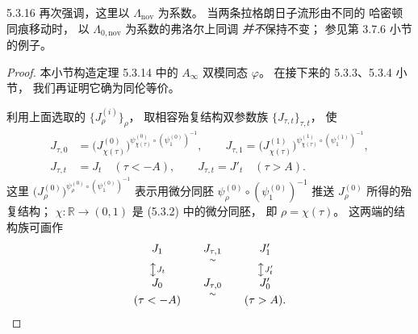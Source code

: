 \begin{remark}{5.3.16}\label{rem:5-3-16}
再次强调，这里以
$\Lambda_{\mathrm{nov}}$ 为系数。
当两条拉格朗日子流形由不同的
哈密顿同痕移动时，
以 $\Lambda_{0,\mathrm{nov}}$
为系数的弗洛尔上同调
\emph{并不}保持不变；
参见第 3.7.6 小节的例子。
\end{remark}

\begin{proof}
本小节构造定理 5.3.14 中的
$A_\infty$ 双模同态 $\varphi$。
在接下来的 5.3.3、5.3.4 小节，
我们再证明它确为同伦等价。

利用上面选取的
$\{J^{(i)}_\rho\}_\rho$，
取相容殆复结构双参数族
$\{J_{\tau,t}\}_{\tau,t}$，
使
\begin{align}
J_{\tau,0}
&=\bigl(J^{(0)}_{\chi(\tau)}\bigr)^{
 \psi^{(0)}_{\chi(\tau)}
 \circ(\psi^{(0)}_1)^{-1}},
\qquad
J_{\tau,1}
=\bigl(J^{(1)}_{\chi(\tau)}\bigr)^{
 \psi^{(1)}_{\chi(\tau)}
 \circ(\psi^{(1)}_1)^{-1}},
\tag{5.3.17.1}\label{eq:5-3-17-1}\\
J_{\tau,t}&=J_t\quad(\tau<-A),
\qquad
J_{\tau,t}=J'_t\quad(\tau>A).
\tag{5.3.17.2}\label{eq:5-3-17-2}
\end{align}
这里
$\bigl(J^{(0)}_\rho\bigr)^{
 \psi^{(0)}_\rho\circ(\psi^{(0)}_1)^{-1}}$
表示用微分同胚
$\psi^{(0)}_\rho\circ(\psi^{(0)}_1)^{-1}$
推送 $J^{(0)}_\rho$ 所得的殆复结构；
$\chi\colon\mathbb R\to(0,1)$
是 (5.3.2) 中的微分同胚，
即 $\rho=\chi(\tau)$。
这两端的结构族可画作
\[
\begin{array}{ccccc}
J_1&&
\underset{\sim}{J_{\tau,1}}
&&J'_1\\
\big\updownarrow\vcenter{\hbox{\scriptsize$J_t$}}
&&&&
\big\updownarrow\vcenter{\hbox{\scriptsize$J'_t$}}\\
J_0&&
\underset{\sim}{J_{\tau,0}}
&&J'_0\\[-1mm]
(\tau<-A)&&&&(\tau>A).
\end{array}
\]


\end{proof}
